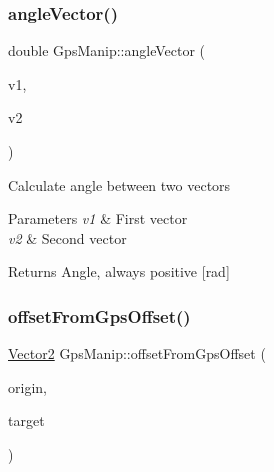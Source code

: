 \subsubsection{\texorpdfstring{angle\+Vector()}{angleVector()}}
{\footnotesize\ttfamily double Gps\+Manip\+::angle\+Vector (\begin{DoxyParamCaption}\item[{const \mbox{\hyperlink{struct_vector2}{Vector2}} \&}]{v1,  }\item[{const \mbox{\hyperlink{struct_vector2}{Vector2}} \&}]{v2 }\end{DoxyParamCaption})\hspace{0.3cm}{\ttfamily [static]}}

Calculate angle between two vectors 
\begin{DoxyParams}{Parameters}
{\em v1} & First vector \\
\hline
{\em v2} & Second vector \\
\hline
\end{DoxyParams}
\begin{DoxyReturn}{Returns}
Angle, always positive \mbox{[}rad\mbox{]} 
\end{DoxyReturn}
\mbox{\label{class_m210_1_1_gps_manip_a1b08acaa8e7dc5d77197382806a86d52}} 
\subsubsection{\texorpdfstring{offset\+From\+Gps\+Offset()}{offsetFromGpsOffset()}\hspace{0.1cm}{\footnotesize\ttfamily [1/2]}}
{\footnotesize\ttfamily \mbox{\hyperlink{struct_vector2}{Vector2}} Gps\+Manip\+::offset\+From\+Gps\+Offset (\begin{DoxyParamCaption}\item[{const \mbox{\hyperlink{class_m210_1_1_geodetic_coord}{Geodetic\+Coord}} \&}]{origin,  }\item[{const \mbox{\hyperlink{class_m210_1_1_geodetic_coord}{Geodetic\+Coord}} \&}]{target }\end{DoxyParamCaption})\hspace{0.3cm}{\ttfamily [static]}}

